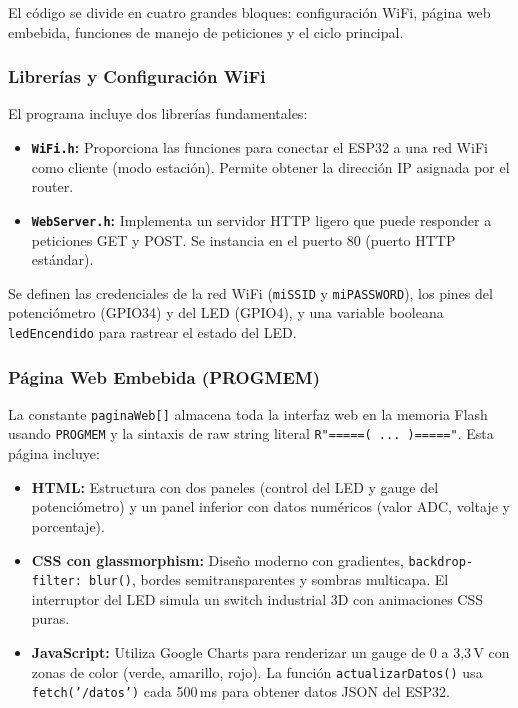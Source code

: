 \documentclass[12pt,a4paper]{article}
\begin{document}
El código se divide en cuatro grandes bloques: configuración WiFi, página web embebida, funciones de manejo de peticiones y el ciclo principal.

\subsubsection*{Librerías y Configuración WiFi}

El programa incluye dos librerías fundamentales:
\begin{itemize}
    \item \textbf{\texttt{WiFi.h}:} Proporciona las funciones para conectar el ESP32 a una red WiFi como cliente (modo estación). Permite obtener la dirección IP asignada por el router.
    \item \textbf{\texttt{WebServer.h}:} Implementa un servidor HTTP ligero que puede responder a peticiones GET y POST. Se instancia en el puerto 80 (puerto HTTP estándar).
\end{itemize}

Se definen las credenciales de la red WiFi (\texttt{miSSID} y \texttt{miPASSWORD}), los pines del potenciómetro (GPIO34) y del LED (GPIO4), y una variable booleana \texttt{ledEncendido} para rastrear el estado del LED.

\subsubsection*{Página Web Embebida (PROGMEM)}

La constante \texttt{paginaWeb[]} almacena toda la interfaz web en la memoria Flash usando \texttt{PROGMEM} y la sintaxis de raw string literal \texttt{R"=====( ... )====="}. Esta página incluye:

\begin{itemize}
    \item \textbf{HTML:} Estructura con dos paneles (control del LED y gauge del potenciómetro) y un panel inferior con datos numéricos (valor ADC, voltaje y porcentaje).
    \item \textbf{CSS con glassmorphism:} Diseño moderno con gradientes, \texttt{backdrop-filter: blur()}, bordes semitransparentes y sombras multicapa. El interruptor del LED simula un switch industrial 3D con animaciones CSS puras.
    \item \textbf{JavaScript:} Utiliza Google Charts para renderizar un gauge de 0 a 3,3\,V con zonas de color (verde, amarillo, rojo). La función \texttt{actualizarDatos()} usa \texttt{fetch('/datos')} cada 500\,ms para obtener datos JSON del ESP32.
\end{itemize}
\end{document}
